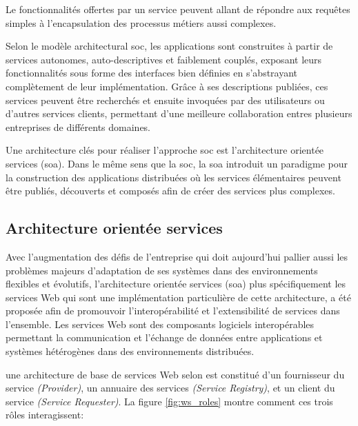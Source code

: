   Le fonctionnalités offertes par un service peuvent allant de
  répondre aux requêtes simples à l'encapsulation des processus
  métiers aussi complexes.

  \medskip

  Selon le modèle architectural \acrshort{soc}, les applications sont
  construites à partir de services autonomes, auto-descriptives et
  faiblement couplés, exposant leurs fonctionnalités sous forme des
  interfaces bien définies en s'abstrayant complètement de leur
  implémentation. Grâce à ses descriptions publiées, ces services
  peuvent être recherchés et ensuite invoquées par des utilisateurs ou
  d'autres services clients, permettant d'une meilleure collaboration
  entres plusieurs entreprises de différents domaines.

  \medskip

  Une architecture clés pour réaliser l'approche \acrshort{soc} est
  l'architecture orientée services (\acrshort{soa}).  Dans le même
  sens que la \acrshort{soc}, la \acrshort{soa} introduit un paradigme
  pour la construction des applications distribuées où les services
  élémentaires peuvent être publiés, découverts et composés afin de
  créer des services plus complexes.

  \subsection{Architecture orientée services}
  \label{sec:soa}
  Avec l'augmentation des défis de l'entreprise qui doit aujourd'hui
  pallier aussi les problèmes majeurs d'adaptation de ses systèmes
  dans des environnements flexibles et évolutifs, l'architecture
  orientée services (\acrshort{soa}) plus spécifiquement les services
  Web qui sont une implémentation particulière de cette architecture,
  a été proposée afin de promouvoir l'interopérabilité et
  l'extensibilité de services dans l'ensemble. Les services Web sont
  des composants logiciels interopérables permettant la communication
  et l'échange de données entre applications et systèmes hétérogènes
  dans des environnements distribuées.

  

  une architecture de base de services Web selon
  \cite{gottschalk2002introduction} est constitué d'un fournisseur du
  service \textit{(Provider)}, un annuaire des services
  \textit{(Service Registry)}, et un client du service
  \textit{(Service Requester)}. La figure \ref{fig:ws_roles} montre
  comment ces trois rôles interagissent:

